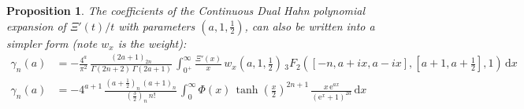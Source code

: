 \documentclass[a4paper,11pt,twoside]{amsart}
\newtheorem{proposition}[theorem]{Proposition}
\begin{document}
\begin{proposition}
The coefficients of the Continuous Dual Hahn polynomial expansion of $\Xi'(t)/t$ with parameters $(a,1,\frac12)$, can also be written into a simpler form (note $w_x$ is the weight):   
\begin{align}
 \gamma_n(a) &= -\frac{4^{a}}{\pi^2}\,\frac{\left(2a+1\right)_{2n}}{\Gamma(2n+2)\,\Gamma(2a+1)} \,\int_{0^+}^\infty \frac{\Xi'(x)}{x}\,w_x\left(a,1,\frac12\right)\,{}_3F_2\left([-n,a+ix,a-ix],\left[a+1,a+\frac12\right],1\right)\, \mathrm{d}x \\
 \gamma_n(a) &= -4^{a+1}\,\frac{\left(a+\frac12\right)_n\,(a+1)_n}{{\left(\frac32\right)_n\,n!}} \,\int_{0}^\infty \Phi(x)\,\tanh\left(\frac{x}{2}\right)^{2n+1}\, \frac{x\,\mathrm{e}^{ax}}{(\mathrm{e}^x+1)^{2a}}\, \mathrm{d}x \label{cdh1}
\end{align}
\end{proposition}
\end{document}
